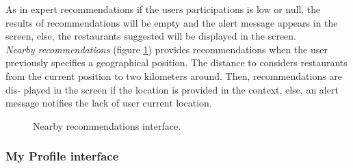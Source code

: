 As in expert  recommendations if the users participations 
is low or null, the results of recommendations will be empty 
and the alert message appears in the
screen, else, the restaurants suggested will be displayed 
in the screen.\\
\textit{Nearby recommendations} (figure \ref{fig:nearby-recs}) 
provides recommendations when the
user previously specifies a geographical position. The distance to
considers restaurants from the current position to two kilometers
around. Then, recommendations are dis- played in the screen if the
location is provided in the context, else, an alert message  notifies
the lack of user current location.
\begin{figure}
\captionsetup{font=footnotesize}
\centering
{}
\caption{Nearby recommendations interface.}
\label{fig:nearby-recs}   
\end{figure}
\subsubsection{My Profile interface}


